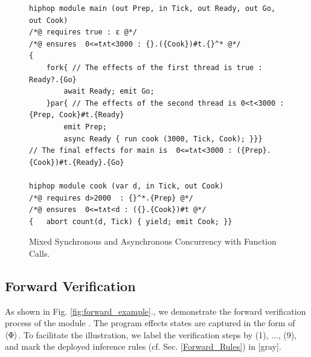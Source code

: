 \documentclass[acmsmall,review,anonymous]{acmart}\settopmatter{printfolios=true,printccs=false,printacmref=false}
\newcommand{\effect}{\textcolor{black}{\ensuremath{\mathrm{\Phi}}}}
\newcommand{\code}[1]{{\tt{\ensuremath{\m{#1}}}}}
\newcommand{\m}{\mathit}
\newcommand\figref[1]{Fig. \textcolor{black}{\ref{#1}}.}
\newcommand\secref[1]{Sec. \textcolor{black}{\ref{#1}}}
\begin{document}
\begin{figure}[h]
      \vspace{-2mm}
\begin{lstlisting}[columns=fullflexible]
hiphop module main (out Prep, in Tick, out Ready, out Go, out Cook)
/*@ requires true : ε @*/
/*@ ensures  0<=t∧t<3000 : {}.({Cook})#t.{}^* @*/
{
	fork{ // The effects of the first thread is true : Ready?.{Go}
		await Ready; emit Go; 
	}par{ // The effects of the second thread is 0<t<3000 : {Prep, Cook}#t.{Ready}
		emit Prep;
		async Ready { run cook (3000, Tick, Cook); }}}
// The final effects for main is  0<=t∧t<3000 : ({Prep}.{Cook})#t.{Ready}.{Go} 
      
hiphop module cook (var d, in Tick, out Cook)
/*@ requires d>2000  : {}^*.{Prep} @*/
/*@ ensures  0<=t∧t<d : ({}.{Cook})#t @*/
{	abort count(d, Tick) { yield; emit Cook; }}
\end{lstlisting}  
      \vspace{-1mm}
      \caption{Mixed Synchronous and Asynchronous Concurrency with Function Calls.}\label{fig:overview_eg2}
            \vspace{-1mm}
\end{figure}



      \vspace{-2mm}
\subsection{Forward Verification}
As shown in \figref{fig:forward_example}, we demonstrate the forward verification process of the module  {}. The program effects states  are captured in the form of \code{\langle \textcolor{huntergreen}{\effect} \rangle}. To facilitate the illustration, we label the verification steps by (1), ..., (9), and mark the deployed inference rules (cf. \secref{Forward_Rules}) in \textcolor{mGray}{[gray]}.
\end{document}
